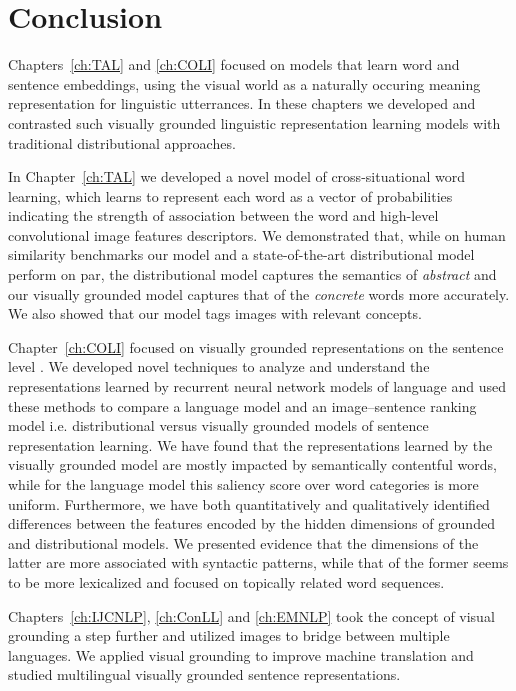 \section{Conclusion}

Chapters~\ref{ch:TAL} and \ref{ch:COLI} focused on models that learn word and sentence embeddings, 
using the visual world as a naturally occuring meaning representation for linguistic utterrances. 
In these chapters we developed and contrasted such visually grounded linguistic representation learning
models with traditional distributional approaches. 

In Chapter~\ref{ch:TAL} we developed a novel model of cross-situational word learning, which learns to represent
each word as a vector of probabilities indicating the strength of association between the word and high-level 
convolutional image features descriptors. 
We demonstrated that, while on human similarity benchmarks our model and a state-of-the-art distributional model 
perform on par, the distributional model captures the semantics of \emph{abstract} and our visually grounded model 
captures that of the \emph{concrete} words more accurately. We also showed that our model tags images with relevant
concepts.
  
Chapter~\ref{ch:COLI} focused on visually grounded representations on the sentence level . 
We developed novel techniques to analyze and understand the representations learned by recurrent
neural network models of language and used these methods to compare a language model and an image--sentence ranking
model i.e. distributional versus visually grounded models of sentence representation learning. We have found that the 
representations learned by the visually grounded model are mostly impacted by semantically contentful words, while
for the language model this saliency score over word categories is more uniform. Furthermore, we have 
both quantitatively and qualitatively identified differences between the features encoded by the hidden dimensions
of grounded and distributional models. We presented evidence that
the dimensions of the latter are more associated with syntactic patterns, while  that of the former seems 
to be more lexicalized and focused on topically related word sequences.

Chapters~\ref{ch:IJCNLP}, \ref{ch:ConLL} and \ref{ch:EMNLP} took the concept of visual grounding 
a step further and utilized images to bridge between multiple languages. We applied visual grounding 
to improve machine translation and studied multilingual visually grounded sentence representations.

